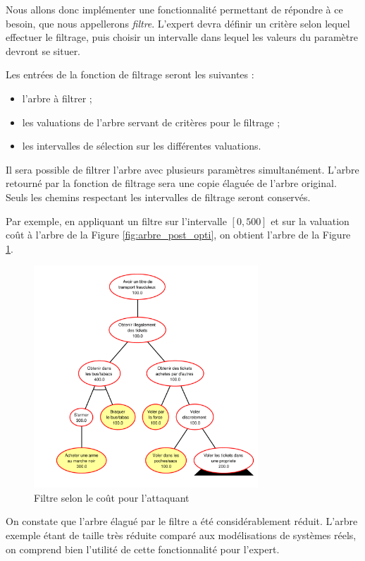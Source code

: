 		Nous allons donc implémenter une fonctionnalité permettant de répondre à ce besoin, que nous appellerons \textit{filtre}. L'expert devra définir un critère selon lequel effectuer le filtrage, puis choisir un intervalle dans lequel les valeurs du paramètre devront se situer.

		Les entrées de la fonction de filtrage seront les suivantes :
		\begin{itemize}
			\item l'arbre à filtrer ;
			\item les valuations de l'arbre servant de critères pour le filtrage ;
			\item les intervalles de sélection sur les différentes valuations.
		\end{itemize}
		
		Il sera possible de filtrer l'arbre avec plusieurs paramètres simultanément.
		L'arbre retourné par la fonction de filtrage sera une copie élaguée de l'arbre original. Seuls les chemins respectant les intervalles de filtrage seront conservés.

		Par exemple, en appliquant un filtre sur l'intervalle $[0, 500]$ et sur la valuation \og coût \fg à l'arbre de la {\sc Figure} \ref{fig:arbre_post_opti}, on obtient l'arbre de la {\sc Figure} \ref{fig:arbre_post_filtre}.

		\begin{figure}[!h]
			\begin{center}
				\includegraphics[width=0.75\textwidth]{figure/post_filtre.pdf}
			\end{center}
			\caption{Filtre selon le coût pour l'attaquant}
			\label{fig:arbre_post_filtre}
		\end{figure}
		On constate que l'arbre élagué par le filtre a été considérablement réduit. L'arbre exemple étant de taille très réduite comparé aux modélisations de systèmes réels, on comprend bien l'utilité de cette fonctionnalité pour l'expert.

